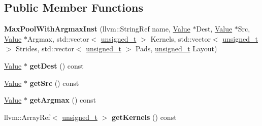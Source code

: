 \subsection*{Public Member Functions}
\begin{DoxyCompactItemize}
\item 
\mbox{\label{classglow_1_1_max_pool_with_argmax_inst_a7836b28c3547ebfaa1e4cead3b42f523}} 
{\bfseries Max\+Pool\+With\+Argmax\+Inst} (llvm\+::\+String\+Ref name, \hyperlink{classglow_1_1_value}{Value} $\ast$Dest, \hyperlink{classglow_1_1_value}{Value} $\ast$Src, \hyperlink{classglow_1_1_value}{Value} $\ast$Argmax, std\+::vector$<$ \hyperlink{namespaceglow_a0ca574644e1e42ef193a9947fb4d8911}{unsigned\+\_\+t} $>$ Kernels, std\+::vector$<$ \hyperlink{namespaceglow_a0ca574644e1e42ef193a9947fb4d8911}{unsigned\+\_\+t} $>$ Strides, std\+::vector$<$ \hyperlink{namespaceglow_a0ca574644e1e42ef193a9947fb4d8911}{unsigned\+\_\+t} $>$ Pads, \hyperlink{namespaceglow_a0ca574644e1e42ef193a9947fb4d8911}{unsigned\+\_\+t} Layout)
\item 
\mbox{\label{classglow_1_1_max_pool_with_argmax_inst_a193a75b0a4834728eafedb39c58c6052}} 
\hyperlink{classglow_1_1_value}{Value} $\ast$ {\bfseries get\+Dest} () const
\item 
\mbox{\label{classglow_1_1_max_pool_with_argmax_inst_a05415c903a0b3112a816143e0eb15843}} 
\hyperlink{classglow_1_1_value}{Value} $\ast$ {\bfseries get\+Src} () const
\item 
\mbox{\label{classglow_1_1_max_pool_with_argmax_inst_ac4cff5d8eda2f88a2dd33e279c800d3e}} 
\hyperlink{classglow_1_1_value}{Value} $\ast$ {\bfseries get\+Argmax} () const
\item 
\mbox{\label{classglow_1_1_max_pool_with_argmax_inst_a56acdd6b4a238804290e5d9780fae92b}} 
llvm\+::\+Array\+Ref$<$ \hyperlink{namespaceglow_a0ca574644e1e42ef193a9947fb4d8911}{unsigned\+\_\+t} $>$ {\bfseries get\+Kernels} () const
\item 
\mbox{\label{classglow_1_1_max_pool_with_argmax_inst_afe975f73b3fe860d23156c80d83eba0d}} 

\end{DoxyCompactItemize}
